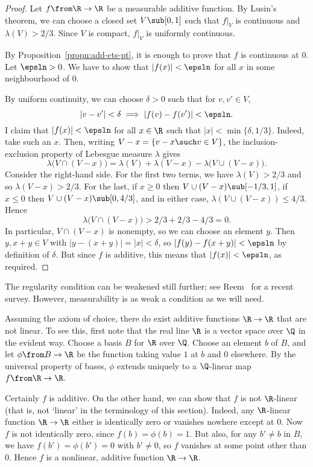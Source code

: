 \begin{proof}
Let $f \from \R \to \R$ be a measurable additive function.  
By Lusin's theorem, we can choose a closed set $V \sub [0, 1]$ such that
$f|_V$ is continuous and $\lambda(V) > 2/3$.  Since $V$ is compact, $f|_V$
is uniformly continuous.

By Proposition~\ref{propn:add-cts-pt}, it is enough to prove that $f$ is
continuous at $0$.  Let $\epsln > 0$.  We have to show that $|f(x)| <
\epsln$ for all $x$ in some neighbourhood of $0$.

By uniform continuity, we can choose $\delta > 0$ such that for $v, v' \in
V$,
\[
|v - v'| < \delta \implies |f(v) - f(v')| < \epsln.
\]
I claim that $|f(x)| < \epsln$ for all $x \in \R$ such that $|x| <
\min\{\delta, 1/3\}$.  Indeed, take such an $x$.  Then, writing $V - x = \{
v - x \such v \in V\}$, the inclusion-exclusion property of Lebesgue
measure $\lambda$ gives
\[
\lambda\bigl(V \cap (V - x)\bigr)
=
\lambda(V) + \lambda(V - x) - \lambda\bigl(V \cup (V - x)\bigr).
\]
Consider the right-hand side.  For the first two terms, we have $\lambda(V)
> 2/3$ and so $\lambda(V - x) > 2/3$.  For the last, if $x \geq 0$ then $V
\cup (V - x) \sub [-1/3, 1]$, if $x \leq 0$ then $V \cup (V - x) \sub [0,
  4/3]$, and in either case, $\lambda(V \cup (V - x)) \leq 4/3$.  Hence
\[
\lambda\bigl(V \cap (V - x)\bigr) > 2/3 + 2/3 - 4/3 = 0.
\]
In particular, $V \cap (V - x)$ is nonempty, so we can choose an element
$y$.  Then $y, x + y \in V$ with $|y - (x + y)| = |x| < \delta$, so $|f(y)
- f(x + y)| < \epsln$ by definition of $\delta$.  But since $f$ is
additive, this means that $|f(x)| < \epsln$, as required.
\end{proof}

The regularity condition can be weakened still further; see
Reem~\cite{Reem} for a recent survey.  However, measurability is as weak a
condition as we will need.

\begin{remark}
Assuming the axiom of choice, there do exist additive functions $\R \to \R$
that are not linear.  To see this, first note that the real line $\R$ is a
vector space over $\Q$ in the evident way.  Choose a basis $B$ for $\R$
over $\Q$.  Choose an element $b$ of $B$, and let $\phi \from B \to \R$ be
the function taking value $1$ at $b$ and $0$ elsewhere.  By the universal
property of bases, $\phi$ extends uniquely to a $\Q$-linear map
$f \from \R \to \R$.

Certainly $f$ is additive.  On the other hand, we can show that $f$ is not
$\R$-linear (that is, not `linear' in the terminology of this section).
Indeed, any $\R$-linear function $\R \to \R$ either is identically zero or
vanishes nowhere except at $0$.  Now $f$ is not identically zero,
since $f(b) = \phi(b) = 1$.  But also, for any $b' \neq b$ in $B$,
we have $f(b') = \phi(b') = 0$ with $b' \neq 0$, so $f$ vanishes at some
point other than $0$.  Hence $f$ is a nonlinear, additive function $\R \to
\R$.
\end{remark}

